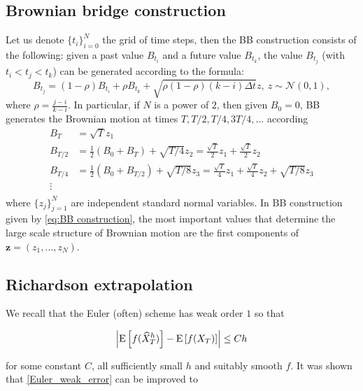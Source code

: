 \documentclass[11pt]{article}
\newcommand{\expt}[1]{\mathrm{E}\left[#1\right]}
\newcommand{\COMMA}{,}
\begin{document}
\subsection{Brownian bridge construction}\label{sec:Brwonian bridge construction}

Let us denote $\{t_i\}_{i=0}^{N}$ the grid of time steps, then the BB construction \cite{glasserman2004monte} consists of the following: given a past value $B_{t_i}$ and a future value $B_{t_k}$, the value $B_{t_j}$ (with $t_i < t_j < t_k$) can be generated according to the formula:
\begin{equation}
B_{t_j}=(1-\rho) B_{t_i}+\rho B_{t_k}+ \sqrt{\rho (1-\rho)(k-i) \Delta t} z, \: z \sim \mathcal{N}(0,1) \COMMA
\end{equation}
where $\rho=\frac{j-i}{k-i}$.  In particular, if $N$ is a power of $2$, then given $B_0=0$, BB generates the Brownian motion at times $T, T/2,T/4,3T/4,\dots$ according
\begin{align}\label{eq:BB construction}
	B_T&=\sqrt{T}z_1\nonumber\\
	B_{T/2}&= \frac{1}{2}(B_{0}+B_{T})+\sqrt{T/4}z_2= \frac{\sqrt{T}}{2} z_1+\frac{\sqrt{T}}{2} z_2\nonumber\\
	B_{T/4}&=\frac{1}{2} (B_{0}+B_{T/2})+\sqrt{T/8}z_3= \frac{\sqrt{T}}{4} z_1+\frac{\sqrt{T}}{4} z_2+\sqrt{T/8}z_3\nonumber\\
	\vdots \nonumber\\
\end{align}
where $\{z_j\}_{j=1}^{N}$ are independent standard normal variables.  In BB construction given by \eqref{eq:BB construction}, the most important values that determine the large scale structure of Brownian motion are the first components of $\mathbf{z} = (z_1,\dots,z_N)$.




\subsection{Richardson extrapolation}\label{sec:Richardson extrapolation}


We  recall that the Euler (often) scheme has weak order $1$ so that

\begin{align}\label{Euler_weak_error}
	\abs{\expt{f(\hat{X}_T^h)}-\expt{f(X_T)} }  \leq C h
\end{align}

for some constant $C$, all sufficiently small $h$ and suitably smooth $f$. It was shown that \ref{Euler_weak_error} can be improved to
\end{document}
